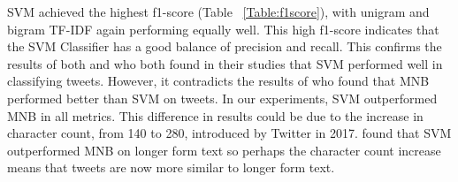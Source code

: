 SVM achieved the highest f1-score (Table ~\ref{Table:f1score}), with unigram and bigram TF-IDF again performing equally well. This high f1-score indicates that the SVM Classifier has a good balance of precision and recall. This confirms the results of both \cite{Raithi2018} and \cite{Rane2018} who both found in their studies that SVM performed well in classifying tweets. However, it contradicts the results of \cite{Berm2010} who found that MNB performed better than SVM on tweets. In our experiments, SVM outperformed MNB in all metrics. This difference in results could be due to the increase in character count, from 140 to 280, introduced by Twitter in 2017. \cite{Berm2010} found that SVM outperformed MNB on longer form text so perhaps the character count increase means that tweets are now more similar to longer form text.

